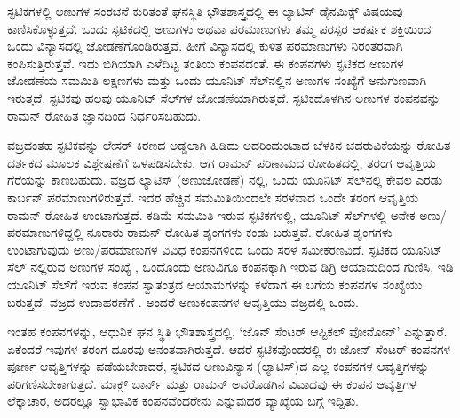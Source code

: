 
ಸ್ಫಟಿಕಗಳಲ್ಲಿ ಅಣುಗಳ ಸಂರಚನೆ ಕುರಿತಂತೆ ಘನಸ್ಥಿತಿ ಭೌತಶಾಸ್ತ್ರದಲ್ಲಿ ಈ ಲ್ಯಾಟಿಸ್ ಡೈನಮಿಕ್ಸ್ ವಿಷಯವು ಕಾಣಿಸಿಕೊಳ್ಳುತ್ತದೆ. ಒಂದು ಸ್ಫಟಿಕದಲ್ಲಿ ಅಣುಗಳು ಅಥವಾ ಪರಮಾಣುಗಳು ತಮ್ಮ ಪರಸ್ಪರ ಆಕರ್ಷಕ ಶಕ್ತಿಯಿಂದ ಒಂದು ವಿನ್ಯಾಸದಲ್ಲಿ ಜೋಡಣೆಗೊಂಡಿರುತ್ತವೆ. ಹೀಗೆ ವಿನ್ಯಾಸದಲ್ಲಿ ಕುಳಿತ ಪರಮಾಣುಗಳು ನಿರಂತರವಾಗಿ ಕಂಪಿಸುತ್ತಿರುತ್ತವೆ. ಇದು ಬಿಗಿಯಾಗಿ ಎಳೆದಿಟ್ಟ ತಂತಿಯ ಕಂಪನದಂತೆ. ಈ ಕಂಪನಗಳು ಸ್ಫಟಿಕದ ಅಣುಗಳ ಜೋಡಣೆಯ ಸಮಮಿತಿ ಲಕ್ಷಣಗಳು ಮತ್ತು ಒಂದು ಯೂನಿಟ್ ಸೆಲ್‍ನಲ್ಲಿನ ಅಣುಗಳ ಸಂಖ್ಯೆಗೆ ಅನುಗುಣವಾಗಿ ಇರುತ್ತದೆ. ಸ್ಫಟಿಕವು ಹಲವು ಯೂನಿಟ್ ಸೆಲ್‍ಗಳ ಜೋಡಣೆಯಾಗಿರುತ್ತದೆ. ಸ್ಫಟಿಕದೊಳಗಿನ ಅಣುಗಳ ಕಂಪನವನ್ನು ರಾಮನ್ ರೋಹಿತ ಜ್ಞಾನದಿಂದ ನಿರ್ಧರಿಸಬಹುದು.

ವಜ್ರದಂತಹ ಸ್ಫಟಿಕವನ್ನು ಲೇಸರ್ ಕಿರಣದ ಅಡ್ಡಲಾಗಿ ಹಿಡಿದು ಅದರಿಂದುಂಟಾದ ಬೆಳಕಿನ ಚದರುವಿಕೆಯನ್ನು ರೋಹಿತ ದರ್ಶಕದ ಮೂಲಕ ವಿಶ್ಲೇಷಣೆಗೆ ಒಳಪಡಿಸಬೇಕು. ಆಗ ರಾಮನ್ ಪರಿಣಾಮದ ರೋಹಿತದಲ್ಲಿ,  ತರಂಗ ಆವೃತ್ತಿಯ ಗೆರೆಯನ್ನು ಕಾಣಬಹುದು. ವಜ್ರದ ಲ್ಯಾಟಿಸ್ (ಅಣುಜೋಡಣೆ) ನಲ್ಲಿ, ಒಂದು ಯೂನಿಟ್ ಸೆಲ್‍ನಲ್ಲಿ ಕೇವಲ ಎರಡು ಕಾರ್ಬನ್ ಪರಮಾಣುಗಳಿರುತ್ತವೆ. ಇದರ ಹೆಚ್ಚಿನ ಸಮಮಿತಿಯಿಂದಲೇ ಸರಳವಾದ ಒಂದೇ ತರಂಗ ಆವೃತ್ತಿಯ ರಾಮನ್ ರೋಹಿತ ಉಂಟಾಗುತ್ತದೆ. ಕಡಿಮೆ ಸಮಮಿತಿ ಇರುವ ಸ್ಫಟಿಕಗಳಲ್ಲಿ, ಯೂನಿಟ್ ಸೆಲ್‍ಗಳಲ್ಲಿ ಅನೇಕ ಅಣು/ಪರಮಾಣುಗಳಿದ್ದಲ್ಲಿ ನೂರಾರು ರಾಮನ್ ರೋಹಿತ ಶೃಂಗಗಳು ಕಂಡು ಬರುತ್ತವೆ. ರೋಹಿತ ಶೃಂಗಗಳು ಉಂಟಾಗುವುದು ಅಣು/ಪರಮಾಣುಗಳ ವಿವಿಧ ಕಂಪನಗಳಿಂದ ಒಂದು ಸರಳ ಸಮೀಕರಣವಿದೆ. ಸ್ಫಟಿಕದ ಯೂನಿಟ್ ಸೆಲ್ ನಲ್ಲಿರುವ ಅಣುಗಳ ಸಂಖ್ಯೆ \enginline{-} , ಒಂದೊಂದು ಅಣುವಿಗೂ ಕಂಪನಕ್ಕಾಗಿ ಇರುವ  ಡಿಗ್ರಿ ಆಯಾಮದಿಂದ ಗುಣಿಸಿ, ಇಡಿ ಯೂನಿಟ್ ಸೆಲ್‍ಗೆ ಇರುವ ಕಂಪನ ಸ್ವಾತಂತ್ರದ ಆಯಾಮಗಳನ್ನು ಕಳೆದಾಗ \enginline{-} ಈ ಬಗೆಯ ಕಂಪನಗಳ ಸಂಖ್ಯೆಯು ಬರುತ್ತದೆ. ವಜ್ರದ ಉದಾಹರಣೆಗೆ . ಅಂದರೆ  ಅಣುಕಂಪನಗಳ ಆವೃತ್ತಿಯು ವಜ್ರದಲ್ಲಿ ಒಂದು.

ಇಂತಹ ಕಂಪನಗಳನ್ನು, ಆಧುನಿಕ ಘನ ಸ್ಥಿತಿ ಭೌತಶಾಸ್ತ್ರದಲ್ಲಿ, ‘ಜೊನ್ ಸೆಂಟರ್ ಆಪ್ಟಿಕಲ್ ಫೋನೋನ್’ ಎನ್ನುತ್ತಾರೆ. ಏಕೆಂದರೆ ಇವುಗಳ ತರಂಗ ದೂರವು ಅನಂತವಾಗಿರುತ್ತದೆ. ಆದರೆ ಸ್ಫಟಿಕವೊಂದರಲ್ಲಿ ಈ ಜೋನ್ ಸೆಂಟರ್ ಕಂಪನಗಳ ಪೂರ್ಣ ಆವೃತ್ತಿಗಳನ್ನು ಪಡೆಯಬೇಕಾದರೆ, ಸ್ಫಟಿಕದ ಅಣುವಿನ್ಯಾಸ (ಲ್ಯಾಟಿಸ್)ದ ಎಲ್ಲ ಕಂಪನಗಳ ಆವೃತ್ತಿಗಳನ್ನು ಪರಿಗಣಿಸಬೇಕಾಗುತ್ತದೆ. ಮಾಕ್ಸ್ ಬಾರ್ನ್ ಮತ್ತು ರಾಮನ್ ಅವರೊಡಗಿನ ವಿವಾದವು ಈ ಕಂಪನ ಆವೃತ್ತಿಗಳ ಲೆಕ್ಕಾಚಾರ, ಅದರಲ್ಲೂ ಸ್ವಾಭಾವಿಕ ಕಂಪನವೆಂದರೇನು ಎನ್ನುವುದರ ವ್ಯಾಖ್ಯೆಯ ಬಗ್ಗೆ ಇದ್ದಿತು.

